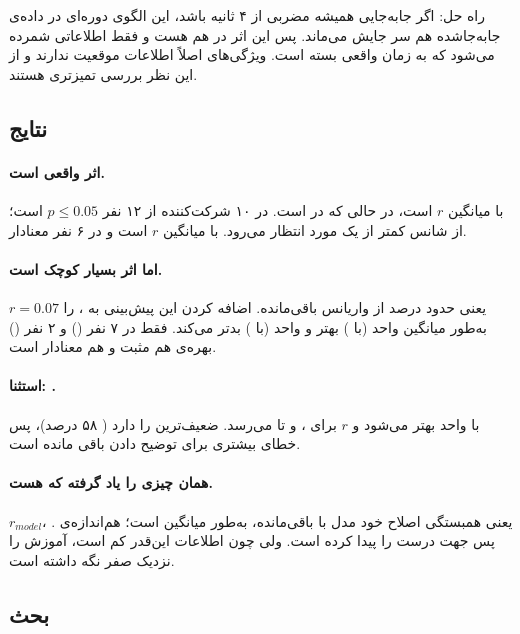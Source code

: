راه حل: اگر جابه‌جایی همیشه مضربی از ۴ ثانیه باشد، این الگوی دوره‌ای در داده‌ی جابه‌جاشده هم سر جایش می‌ماند. پس این اثر در  هم هست و فقط اطلاعاتی شمرده می‌شود که به زمان واقعی بسته است. ویژگی‌های  اصلاً اطلاعات موقعیت ندارند و از این نظر بررسی تمیزتری هستند.

\subsection{نتایج}




\paragraph{اثر واقعی است.} با  میانگین $r$  است، در حالی که در   است. در ۱۰ شرکت‌کننده از ۱۲ نفر $p\le0.05$ است؛ از شانس کمتر از یک مورد انتظار می‌رود. با  میانگین $r$  است و در ۶ نفر معنادار.

\paragraph{اما اثر بسیار کوچک است.} $r=0.07$ یعنی حدود  درصد از واریانس باقی‌مانده. اضافه کردن این پیش‌بینی به ،  را به‌طور میانگین  واحد (با ) بهتر و  واحد (با ) بدتر می‌کند. فقط در ۷ نفر () و ۲ نفر () بهره‌ی  هم مثبت و هم معنادار است.

\paragraph{استثنا: .} با    واحد بهتر می‌شود و $r$ برای ،  و  تا  می‌رسد.  ضعیف‌ترین  را دارد ( ۵۸ درصد)، پس خطای بیشتری برای توضیح دادن باقی مانده است.

\paragraph{ همان چیزی را یاد گرفته که هست.} $r_{model}$، یعنی همبستگی اصلاح خود مدل با باقی‌مانده، به‌طور میانگین  است؛ هم‌اندازه‌ی . پس  جهت درست را پیدا کرده است. ولی چون اطلاعات این‌قدر کم است، آموزش  را نزدیک صفر نگه داشته است.

\subsection{بحث}

